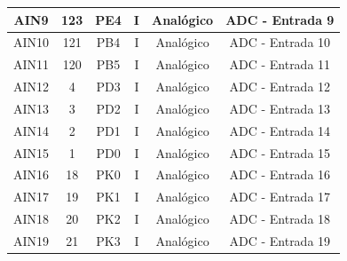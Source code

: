 \begin{table}[H]
\begin{tabular}{|c|c|c|c|c|c|}
		\hline
		AIN9                        & 123                            & PE4                               & I                           & Analógico                     & ADC - Entrada 9                             \\
		\hline
		AIN10                       & 121                            & PB4                               & I                           & Analógico                     & ADC - Entrada 10                            \\
		\hline
		AIN11                       & 120                            & PB5                               & I                           & Analógico                     & ADC - Entrada 11                            \\
		\hline
		AIN12                       & 4                              & PD3                               & I                           & Analógico                     & ADC - Entrada 12                            \\
		\hline
		AIN13                       & 3                              & PD2                               & I                           & Analógico                     & ADC - Entrada 13                            \\
		\hline
		AIN14                       & 2                              & PD1                               & I                           & Analógico                     & ADC - Entrada 14                            \\
		\hline
		AIN15                       & 1                              & PD0                               & I                           & Analógico                     & ADC - Entrada 15                            \\
		\hline
		AIN16                       & 18                             & PK0                               & I                           & Analógico                     & ADC - Entrada 16                            \\
		\hline
		AIN17                       & 19                             & PK1                               & I                           & Analógico                     & ADC - Entrada 17                            \\
		\hline
		AIN18                       & 20                             & PK2                               & I                           & Analógico                     & ADC - Entrada 18                            \\
		\hline
		AIN19                       & 21                             & PK3                               & I                           & Analógico                     & ADC - Entrada 19                            \\

\end{tabular}
\end{table}
